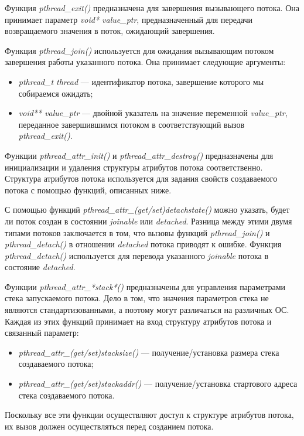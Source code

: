 Функция \textit{pthread\_exit()} предназначена для завершения вызывающего потока.
Она принимает параметр \textit{void* value\_ptr}, предназначенный для передачи
возвращаемого значения в поток, ожидающий завершения.
\pagebreak

Функция \textit{pthread\_join()} используется для ожидания вызывающим потоком
завершения работы указанного потока. Она принимает следующие аргументы:
\begin{itemize}
  \item \textit{pthread\_t thread} --- идентификатор потока,
    завершение которого мы собираемся ожидать;
  \item \textit{void** value\_ptr} --- двойной указатель на значение переменной
    \textit{value\_ptr}, переданное завершившимся потоком в
    соответствующий вызов \textit{pthread\_exit()}.
\end{itemize}

Функции \textit{pthread\_attr\_init()} и \textit{pthread\_attr\_destroy()}
предназначены для инициализации и удаления структуры атрибутов
потока соответственно. Структура атрибутов потока используется для
задания свойств создаваемого потока с помощью функций, описанных ниже.

С помощью функций \textit{pthread\_attr\_(get/set)detachstate()} можно указать,
будет ли поток создан в состоянии \textit{joinable} или \textit{detached}.
Разница между этими двумя типами потоков заключается в том,
что вызовы функций \textit{pthread\_join()} и \textit{pthread\_detach()}
в отношении \textit{detached} потока приводят к ошибке.
Функция \textit{pthread\_detach()} используется для перевода указанного \textit{joinable}
потока в состояние \textit{detached}.

Функции \textit{pthread\_attr\_*stack*()} предназначены для управления
параметрами стека запускаемого потока. Дело в том, что значения параметров стека
не являются стандартизованными, а поэтому могут различаться на различных ОС.
Каждая из этих функций принимает на вход структуру атрибутов потока и связанный параметр:
\begin{itemize}
  \item \textit{pthread\_attr\_(get/set)stacksize()} --- получение/установка размера стека
    создаваемого потока;
  \item \textit{pthread\_attr\_(get/set)stackaddr()} --- получение/установка стартового адреса
    стека создаваемого потока.
\end{itemize}

Поскольку все эти функции осуществляют доступ к структуре
атрибутов потока, их вызов должен осуществляться перед созданием потока.


